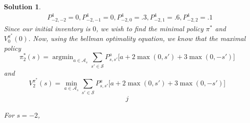 \documentclass[12pt]{amsart}
\newtheorem{sol}[thm]{Solution}
\newcommand{\MA}{\mathcal{A}}
\newcommand{\MS}{\mathcal{S}}
\DeclareMathOperator*{\argmin}{argmin}
\begin{document}
\begin{sol}
\begin{align*}
&P^4_{-2,-2} = 0, P^4_{-2,-1} = 0, P^4_{-2,0} = .3, P^4_{-2,1} = .6, P^4_{-2,2} = .1 
\end{align*}
Since our initial inventory is $0$, we wish to find the minimal policy $\pi^*$ and $V^{\pi^*}_0(0)$. Now, using the bellman optimality equation, we know that the maximal policy $$\pi^*_2(s) = \argmin_{a \in \MA_s} \sum_{s' \in \MS} P^a_{s,s'} \bigg[ a + 2\max(0, s')+3\max(0,-s')\bigg]$$ and $$ V^{\pi^*}_{2}(s) = \min_{a \in \MA_s} \sum_{s' \in \MS} P^a_{s,s'} \bigg[ a + 2\max(0, s')+3\max(0,-s')\bigg]$$
\begin{align*}
j
\end{align*}

For $s = -2$, 
\end{sol}
\end{document}

